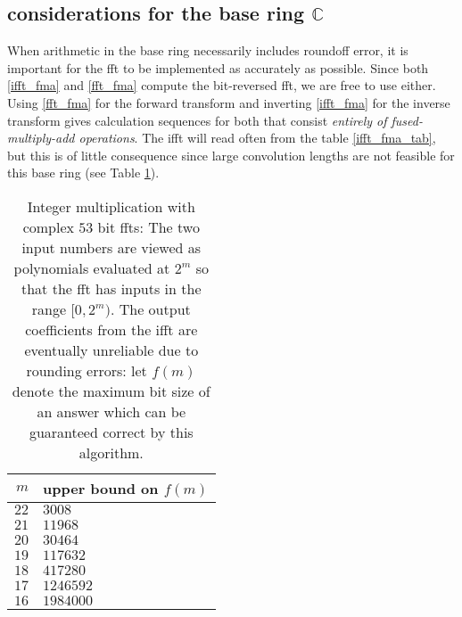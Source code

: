 \documentclass[12 pt]{amsart}
\newcommand\T{\rule{0pt}{-1.0ex}}       %
\newcommand\B{\rule[0.5ex]{0pt}{0pt}} %
\begin{document}
\subsection{considerations for the base ring $\mathbb{C}$}
\label{section_CC}
When arithmetic in the base ring necessarily includes roundoff error, it is
important for the fft to be implemented as accurately as possible. Since both
\eqref{ifft_fma} and \eqref{fft_fma} compute the bit-reversed fft, we are free
to use either. Using \eqref{fft_fma} for the forward transform and inverting
\eqref{ifft_fma} for the inverse transform gives calculation sequences for both
that consist \emph{entirely of fused-multiply-add operations}. The ifft will
read often from the table \eqref{ifft_fma_tab}, but this is of little
consequence since large convolution lengths are not feasible for this base ring
(see Table \ref{doubles_suck}).
\begin{table}
\caption{Integer multiplication with complex $53$ bit ffts: The two input
numbers are viewed as polynomials evaluated at $2^m$ so that the fft has inputs
in the range $[0,2^m)$. The output coefficients from the ifft are eventually
unreliable due to rounding errors: let $f(m)$ denote the maximum
bit size of an answer which can be guaranteed correct by this algorithm.}
\label{doubles_suck}
\begin{tabular}{r|l}
$m$ & upper bound on $f(m)$\\
\hline
$22$ & $3008$\T\B\\
$21$ & $11968$\T\B\\
$20$ & $30464$\T\B\\
$19$ & $117632$\T\B\\
$18$ & $417280$\T\B\\
$17$ & $1246592$\T\B\\
$16$ & $1984000$\T\B
\end{tabular} 
\end{table}
\end{document}
